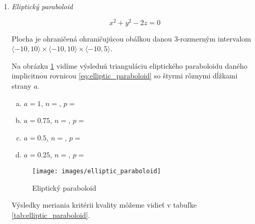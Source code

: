 \begin{enumerate}

\newpage
\item{
    \textit{Eliptický paraboloid}

    \begin{equation}
    \label{eq:elliptic_paraboloid}
        x^2+y^2-2z = 0
    \end{equation}

    Plocha je ohraničená ohraničujúcou obálkou danou $3$-rozmerným intervalom 
    \newline
    \mbox{$\langle -10, 10 \rangle \times \langle -10, 10 \rangle \times \langle -10, 5 \rangle$}.

    Na obrázku \ref{obr:elliptic_paraboloid} vidíme výslednú trianguláciu eliptického paraboloidu
    daného implicitnou rovnicou \ref{eq:elliptic_paraboloid} so štyrmi rôznymi dĺžkami strany $a$.
    \begin{enumerate}[a)]
    \item{
        $a=1$, $n=$, $p=$
    }
    \item{
        $a=0.75$, $n=$, $p=$
    }
    \item{
        $a=0.5$, $n=$, $p=$
    }
    \item{
        $a=0.25$, $n=$, $p=$
    }
    \end{enumerate}

    \begin{figure}
        \centerline{\texttt{[image: images/elliptic\_paraboloid]}}
        \caption[Eliptický paraboloid]{Eliptický paraboloid}
        \label{obr:elliptic_paraboloid}
    \end{figure}

    Výsledky meriania kritérii kvality môžeme vidieť v tabuľke \ref{tab:elliptic_paraboloid}.

}
\end{enumerate}
